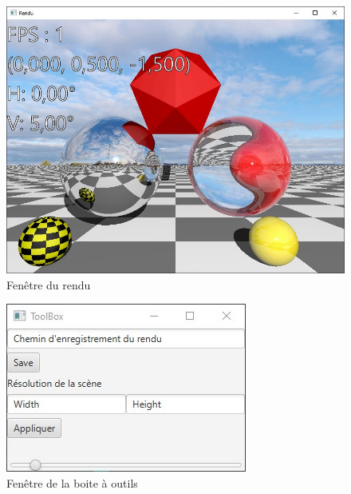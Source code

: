 \begin{figure}[h]
   \caption{Fenêtre du rendu}
   \begin{center}
       \includegraphics{img/render.javafx/render.jpg}
   \end{center}
\end{figure}

\begin{figure}[h]
   \caption{Fenêtre de la boite à outils}
   \begin{center}
       \includegraphics{img/render.javafx/toolbox.jpg}
   \end{center}
\end{figure}
